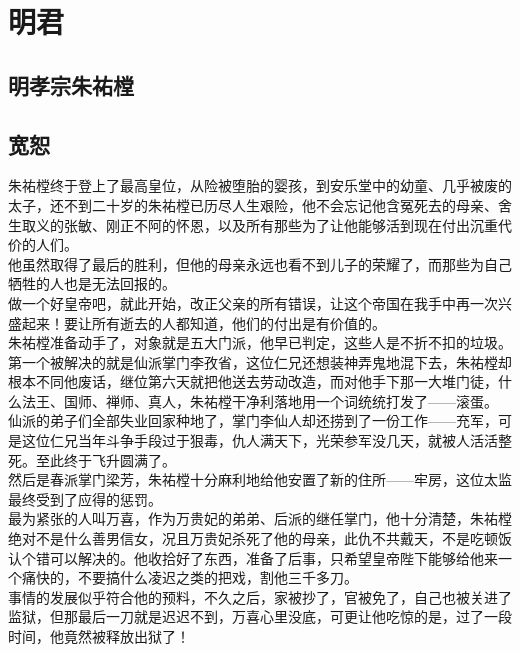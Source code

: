 \section{明君}
\ifnum{}
	\begin{multicols}{\theparacolNo}
\fi
\subsection{明孝宗朱祐樘}
\subsection{宽恕}
朱祐樘终于登上了最高皇位，从险被堕胎的婴孩，到安乐堂中的幼童、几乎被废的太子，还不到二十岁的朱祐樘已历尽人生艰险，他不会忘记他含冤死去的母亲、舍生取义的张敏、刚正不阿的怀恩，以及所有那些为了让他能够活到现在付出沉重代价的人们。\\

他虽然取得了最后的胜利，但他的母亲永远也看不到儿子的荣耀了，而那些为自己牺牲的人也是无法回报的。\\

做一个好皇帝吧，就此开始，改正父亲的所有错误，让这个帝国在我手中再一次兴盛起来！要让所有逝去的人都知道，他们的付出是有价值的。\\

朱祐樘准备动手了，对象就是五大门派，他早已判定，这些人是不折不扣的垃圾。\\

第一个被解决的就是仙派掌门李孜省，这位仁兄还想装神弄鬼地混下去，朱祐樘却根本不同他废话，继位第六天就把他送去劳动改造，而对他手下那一大堆门徒，什么法王、国师、禅师、真人，朱祐樘干净利落地用一个词统统打发了——滚蛋。\\

仙派的弟子们全部失业回家种地了，掌门李仙人却还捞到了一份工作——充军，可是这位仁兄当年斗争手段过于狠毒，仇人满天下，光荣参军没几天，就被人活活整死。至此终于飞升圆满了。\\

然后是春派掌门梁芳，朱祐樘十分麻利地给他安置了新的住所——牢房，这位太监最终受到了应得的惩罚。\\

最为紧张的人叫万喜，作为万贵妃的弟弟、后派的继任掌门，他十分清楚，朱祐樘绝对不是什么善男信女，况且万贵妃杀死了他的母亲，此仇不共戴天，不是吃顿饭认个错可以解决的。他收拾好了东西，准备了后事，只希望皇帝陛下能够给他来一个痛快的，不要搞什么凌迟之类的把戏，割他三千多刀。\\

事情的发展似乎符合他的预料，不久之后，家被抄了，官被免了，自己也被关进了监狱，但那最后一刀就是迟迟不到，万喜心里没底，可更让他吃惊的是，过了一段时间，他竟然被释放出狱了！\\


\end{multicols}
